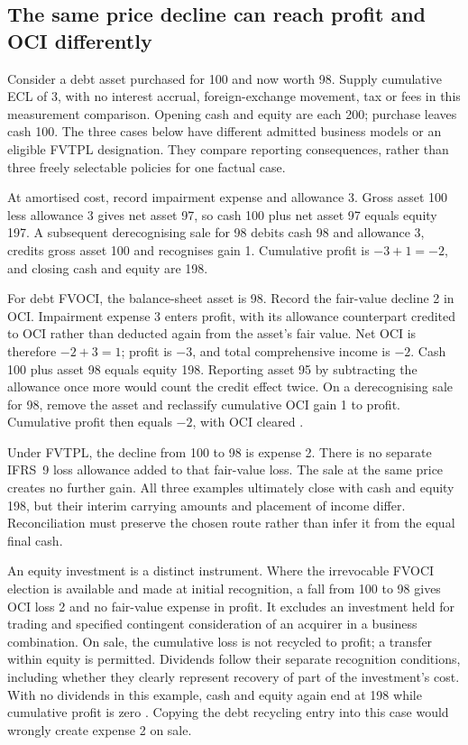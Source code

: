 \subsection{The same price decline can reach profit and OCI differently}

Consider a debt asset purchased for 100 and now worth 98. Supply cumulative
ECL of 3, with no interest accrual, foreign-exchange movement, tax or fees
in this measurement comparison. Opening cash and equity are each 200;
purchase leaves cash 100. The three cases below have different admitted
business models or an eligible FVTPL designation. They compare reporting
consequences, rather than three freely selectable policies for one factual
case.

At amortised cost, record impairment expense and allowance 3. Gross asset
100 less allowance 3 gives net asset 97, so cash 100 plus net asset 97 equals
equity 197. A subsequent derecognising sale for 98 debits cash 98 and
allowance 3, credits gross asset 100 and recognises gain 1. Cumulative
profit is \(-3+1=-2\), and closing cash and equity are 198.

For debt FVOCI, the balance-sheet asset is 98. Record the fair-value decline
2 in OCI. Impairment expense 3 enters profit, with its allowance counterpart
credited to OCI rather than deducted again from the asset's fair value.
Net OCI is therefore \(-2+3=1\); profit is \(-3\), and total
comprehensive income is \(-2\). Cash 100 plus asset 98 equals equity
198. Reporting asset 95 by subtracting the allowance once more would count
the credit effect twice. On a derecognising sale for 98, remove the asset
and reclassify cumulative OCI gain 1 to profit. Cumulative profit then
equals \(-2\), with OCI cleared
\citep[IFRS~9.5.5.1--2, 5.7.10--11]{eu20231803}.

Under FVTPL, the decline from 100 to 98 is expense 2. There is no separate
IFRS~9 loss allowance added to that fair-value loss. The sale at the same
price creates no further gain. All three examples ultimately close with
cash and equity 198, but their interim carrying amounts and placement of
income differ. Reconciliation must preserve the chosen route rather than
infer it from the equal final cash.

An equity investment is a distinct instrument. Where the irrevocable FVOCI
election is available and made at initial recognition, a fall from 100 to
98 gives OCI loss 2 and no fair-value expense in profit. It excludes an
investment held for trading and specified contingent consideration of an
acquirer in a business combination. On sale, the cumulative loss is not
recycled to profit; a transfer within equity is permitted. Dividends follow
their separate recognition conditions, including whether they clearly
represent recovery of part of the investment's cost. With no dividends in
this example, cash and equity again end at 198 while cumulative profit is
zero \citep[IFRS~9.5.7.5--6, B5.7.1--1A]{eu20231803}. Copying the debt
recycling entry into this case would wrongly create expense 2 on sale.

